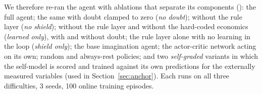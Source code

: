 \documentclass[11pt]{article}
\theoremstyle{remark}
\begin{document}
We therefore re-ran the agent with ablations that separate its components ():
the full agent; the same with doubt clamped to zero (\emph{no doubt}); without the rule layer (\emph{no shield});
without the rule layer and without the hard-coded economics (\emph{learned only}), with and without doubt; the
rule layer alone with no learning in the loop (\emph{shield only}); the base imagination agent; the actor-critic
network acting on its own; random and always-rest policies; and two \emph{self-graded} variants in which the
self-model is scored and trained against its own predictions for the externally measured variables (used in
Section~\ref{sec:anchor}). Each runs on all three difficulties, 3 seeds, 100 online training episodes.


\end{document}

